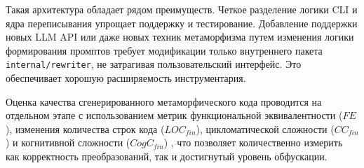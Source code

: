 Такая архитектура обладает рядом преимуществ. Четкое разделение логики CLI и ядра переписывания упрощает поддержку и тестирование. Добавление поддержки новых LLM API или даже новых техник метаморфизма путем изменения логики формирования промптов требует модификации только внутреннего пакета \texttt{internal/rewriter}, не затрагивая пользовательский интерфейс. Это обеспечивает хорошую расширяемость инструментария.

Оценка качества сгенерированного метаморфического кода проводится на отдельном этапе с использованием метрик функциональной эквивалентности ($FE$), изменения количества строк кода ($LOC_{fin}$), цикломатической сложности ($CC_{fin}$) \cite{McCabe76Complexity} и когнитивной сложности ($CogC_{fin}$) \cite{SonarSourceCogC}, что позволяет количественно измерить как корректность преобразований, так и достигнутый уровень обфускации.

